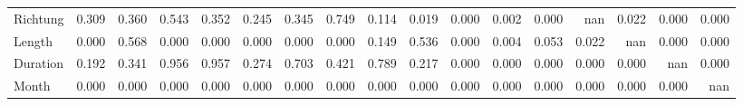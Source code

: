\begin{tabular}{lrrrrrrrrrrrrrrrr}
Richtung & 0.309 & 0.360 & 0.543 & 0.352 &  0.245 &  0.345 & 0.749 &  0.114 &  0.019 & 0.000 & 0.002 &   0.000 &       nan &   0.022 &     0.000 &  0.000 \\
Length   & 0.000 & 0.568 & 0.000 & 0.000 &  0.000 &  0.000 & 0.000 &  0.149 &  0.536 & 0.000 & 0.004 &   0.053 &     0.022 &     nan &     0.000 &  0.000 \\
Duration & 0.192 & 0.341 & 0.956 & 0.957 &  0.274 &  0.703 & 0.421 &  0.789 &  0.217 & 0.000 & 0.000 &   0.000 &     0.000 &   0.000 &       nan &  0.000 \\
Month    & 0.000 & 0.000 & 0.000 & 0.000 &  0.000 &  0.000 & 0.000 &  0.000 &  0.000 & 0.000 & 0.000 &   0.000 &     0.000 &   0.000 &     0.000 &    nan \\
\bottomrule
\end{tabular}
